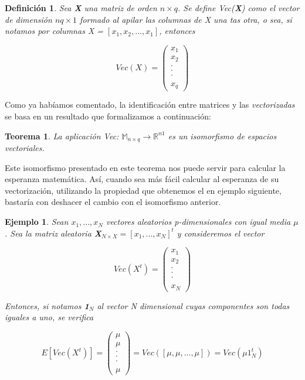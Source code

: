 \documentclass{article}
\theoremstyle{theorem-style}  %
\newtheorem{theorem}{Teorema}[section]  %
\theoremstyle{definition}
\newtheorem{definition}{Definición}[section]
\theoremstyle{example-style}
\newtheorem{example}{Ejemplo}[section]
\begin{document}
\begin{definition}
\textit{	Sea \textbf{X} una matriz de orden $n \times q$. Se define Vec(\textbf{X}) como el vector de dimensión $nq \times 1$ formado al apilar las columnas de X una tas otra, o sea, si notamos por columnas \textit{X} = $[x_1, x_2, ..., x_1]$, entonces}

$$ Vec(X) = \left({\begin{array}{c}
	x_1\\
	x_2\\
	.\\
	.\\
	.\\
	\\
	x_q
	\end{array} } \right)$$
\end{definition}

Como ya habíamos comentado, la identificación entre matrices y las \textit{vectorizadas} se basa en un resultado que formalizamos a continuación:

\begin{theorem}
	\textit{La aplicación Vec: $\mathbb{M}_{n \times q} \rightarrow \mathbb{R}^{n1}$ es un isomorfismo de espacios vectoriales.}
\end{theorem}


Este isomorfismo presentado en este teorema nos puede servir para calcular la esperanza matemática. 
Así, cuando sea más fácil calcular al esperanza de su vectorización, utilizando la propiedad que obtenemos el en ejemplo siguiente, bastaría con deshacer el cambio con el isomorfismo anterior.


\begin{example}
	\textit{Sean $x_1, ... , x_N$  vectores aleatorios p-dimensionales con igual media $\mu$. Sea la matriz aleatoria \textbf{X}$_{N \times X } = [x_1, ..., x_N]^t$ y consideremos el vector}
	
	$$ Vec(X^t) = \left({\begin{array}{c}
		x_1\\
		x_2\\
		.\\
		.\\
		.\\
		\\
		x_N
		\end{array} } \right)$$
	
	\textit{Entonces, si notamos \textbf{1}$_N$ al vector N dimensional cuyas componentes son todas iguales a uno, se verifica}
	
	$$ E[Vec(X^t)] = \left({\begin{array}{c}
		\mu\\
		\mu\\
		.\\
		.\\
		.\\
		\\
		\mu
		\end{array} } \right) = Vec([\mu, \mu, ..., \mu]) = Vec(\mu 1_N^t)$$
\end{example}
\end{document}
